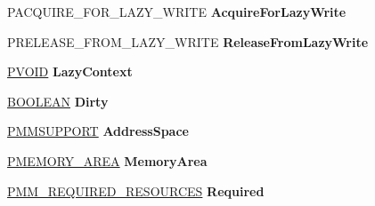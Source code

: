 \begin{DoxyCompactItemize}
\item 
\mbox{\label{struct___w_o_r_k___q_u_e_u_e___w_i_t_h___c_o_n_t_e_x_t_a248cbb453e630e677b186241582ed7ef}} 
P\+A\+C\+Q\+U\+I\+R\+E\+\_\+\+F\+O\+R\+\_\+\+L\+A\+Z\+Y\+\_\+\+W\+R\+I\+TE {\bfseries Acquire\+For\+Lazy\+Write}
\item 
\mbox{\label{struct___w_o_r_k___q_u_e_u_e___w_i_t_h___c_o_n_t_e_x_t_a5e888da65748cc0131fb58f806227199}} 
P\+R\+E\+L\+E\+A\+S\+E\+\_\+\+F\+R\+O\+M\+\_\+\+L\+A\+Z\+Y\+\_\+\+W\+R\+I\+TE {\bfseries Release\+From\+Lazy\+Write}
\item 
\mbox{\label{struct___w_o_r_k___q_u_e_u_e___w_i_t_h___c_o_n_t_e_x_t_abb21feedc663a558171cb8a9f3b7f063}} 
\hyperlink{interfacevoid}{P\+V\+O\+ID} {\bfseries Lazy\+Context}
\item 
\mbox{\label{struct___w_o_r_k___q_u_e_u_e___w_i_t_h___c_o_n_t_e_x_t_a18dd99177ae0b198ec19a110316d554f}} 
\hyperlink{_processor_bind_8h_a112e3146cb38b6ee95e64d85842e380a}{B\+O\+O\+L\+E\+AN} {\bfseries Dirty}
\item 
\mbox{\label{struct___w_o_r_k___q_u_e_u_e___w_i_t_h___c_o_n_t_e_x_t_a7d3b629722cf2b5db29454594b466524}} 
\hyperlink{struct___m_m_s_u_p_p_o_r_t}{P\+M\+M\+S\+U\+P\+P\+O\+RT} {\bfseries Address\+Space}
\item 
\mbox{\label{struct___w_o_r_k___q_u_e_u_e___w_i_t_h___c_o_n_t_e_x_t_a173a35c04340f829e2f298e98a98c628}} 
\hyperlink{struct___m_e_m_o_r_y___a_r_e_a}{P\+M\+E\+M\+O\+R\+Y\+\_\+\+A\+R\+EA} {\bfseries Memory\+Area}
\item 
\mbox{\label{struct___w_o_r_k___q_u_e_u_e___w_i_t_h___c_o_n_t_e_x_t_ad9bf7c979f8b86380d9b07216d1df6e9}} 
\hyperlink{struct___m_m___r_e_q_u_i_r_e_d___r_e_s_o_u_r_c_e_s}{P\+M\+M\+\_\+\+R\+E\+Q\+U\+I\+R\+E\+D\+\_\+\+R\+E\+S\+O\+U\+R\+C\+ES} {\bfseries Required}
\item 
\mbox{\label{struct___w_o_r_k___q_u_e_u_e___w_i_t_h___c_o_n_t_e_x_t_ada7a49f327b27f779f2edd714d17b6ed}} 

\end{DoxyCompactItemize}
